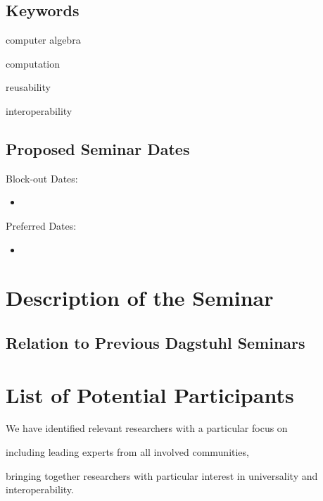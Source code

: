 \documentclass[a4paper,11pt]{article}
\begin{document}
\subsection{Keywords}

\begin{compactitem}
\item computer algebra
\item computation
\item reusability
\item interoperability
\end{compactitem}

\subsection{Proposed Seminar Dates}


Block-out Dates: 
\begin{itemize}
\item 
\end{itemize}

\noindent
Preferred Dates: 
 \begin{itemize}
 \item 
\end{itemize}

\section{Description of the Seminar}
  

\subsection{Relation to Previous Dagstuhl Seminars}


\section{List of Potential Participants}

We have identified  relevant researchers with a particular focus on
\begin{compactitem}
  \item including leading experts from all involved communities,
  \item bringing together researchers with particular interest in universality and interoperability.
\end{compactitem}
\medskip
\end{document}

